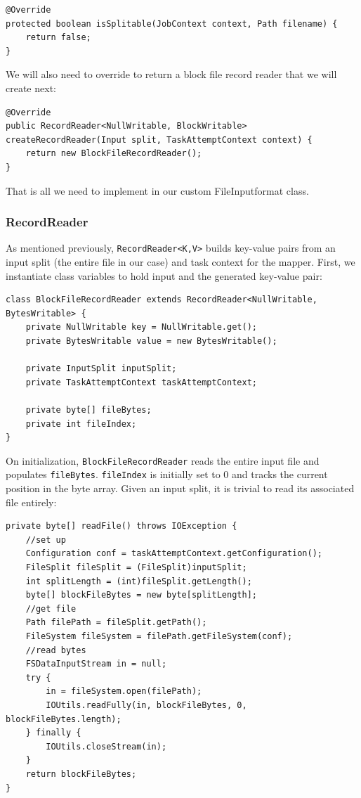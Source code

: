 \documentclass[9pt,twocolumn,twoside]{idsi}
\begin{document}
\lstset{language=Java}
\begin{lstlisting}
@Override
protected boolean isSplitable(JobContext context, Path filename) {
    return false;
}
\end{lstlisting}

We will also need to override  to return a block file record reader that we will create next:

\begin{lstlisting}
@Override
public RecordReader<NullWritable, BlockWritable> createRecordReader(Input split, TaskAttemptContext context) {
    return new BlockFileRecordReader();
}
\end{lstlisting}

That is all we need to implement in our custom FileInputformat class.

\subsubsection{RecordReader}
As mentioned previously, \lstinline{RecordReader<K,V>} builds key-value pairs from an input split (the entire file in our case) and task context for the mapper. First, we instantiate class variables to hold input and the generated key-value pair:

\begin{lstlisting}
class BlockFileRecordReader extends RecordReader<NullWritable, BytesWritable> {
    private NullWritable key = NullWritable.get();
    private BytesWritable value = new BytesWritable();

    private InputSplit inputSplit;
    private TaskAttemptContext taskAttemptContext;

    private byte[] fileBytes;
    private int fileIndex;
}
\end{lstlisting}

On initialization, \lstinline{BlockFileRecordReader} reads the entire input file and populates \lstinline{fileBytes}. \lstinline{fileIndex} is initially set to 0 and tracks the current position in the byte array. Given an input split, it is trivial to read its associated file entirely:

\begin{lstlisting}
private byte[] readFile() throws IOException {
    //set up
    Configuration conf = taskAttemptContext.getConfiguration();
    FileSplit fileSplit = (FileSplit)inputSplit;
    int splitLength = (int)fileSplit.getLength();
    byte[] blockFileBytes = new byte[splitLength];
    //get file
    Path filePath = fileSplit.getPath();
    FileSystem fileSystem = filePath.getFileSystem(conf);
    //read bytes
    FSDataInputStream in = null;
    try {
        in = fileSystem.open(filePath);
        IOUtils.readFully(in, blockFileBytes, 0, blockFileBytes.length);
    } finally {
        IOUtils.closeStream(in);
    }
    return blockFileBytes;
}
\end{lstlisting}
\end{document}
